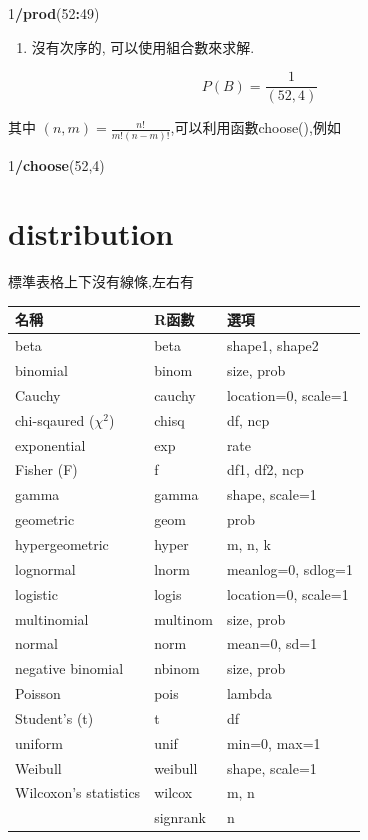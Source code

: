 \documentclass[]{book}
\newenvironment{Shaded}{\begin{snugshade}}{\end{snugshade}}
\newcommand{\KeywordTok}[1]{\textcolor[rgb]{0.13,0.29,0.53}{\textbf{#1}}}
\newcommand{\DecValTok}[1]{\textcolor[rgb]{0.00,0.00,0.81}{#1}}
\newcommand{\OperatorTok}[1]{\textcolor[rgb]{0.81,0.36,0.00}{\textbf{#1}}}
\newcommand{\NormalTok}[1]{#1}
\providecommand{\tightlist}{%
  \setlength{\itemsep}{0pt}\setlength{\parskip}{0pt}}
\theoremstyle{definition}
\theoremstyle{definition}
\theoremstyle{definition}
\theoremstyle{remark}
\begin{document}
\begin{Shaded}
\begin{Highlighting}[]
\DecValTok{1}\OperatorTok{/}\KeywordTok{prod}\NormalTok{(}\DecValTok{52}\OperatorTok{:}\DecValTok{49}\NormalTok{)}
\end{Highlighting}
\end{Shaded}

\begin{enumerate}
\def\labelenumi{\arabic{enumi}.}
\setcounter{enumi}{1}
\tightlist
\item
  沒有次序的, 可以使用組合數來求解.
\end{enumerate}

\[ P(B)=\frac{1}{(52,4)} \]

其中 \((n,m)=\frac{n!}{m!(n-m)!}\),可以利用函數choose(),例如

\begin{Shaded}
\begin{Highlighting}[]
\DecValTok{1}\OperatorTok{/}\KeywordTok{choose}\NormalTok{(}\DecValTok{52}\NormalTok{,}\DecValTok{4}\NormalTok{)}
\end{Highlighting}
\end{Shaded}

\section{distribution}\label{distribution}

標準表格上下沒有線條,左右有

\begin{longtable}[]{@{}lll@{}}
\toprule
名稱 & R函數 & 選項\tabularnewline
\midrule
\endhead
beta & beta & shape1, shape2\tabularnewline
binomial & binom & size, prob\tabularnewline
Cauchy & cauchy & location=0, scale=1\tabularnewline
chi-sqaured (\(\chi^2\)) & chisq & df, ncp\tabularnewline
exponential & exp & rate\tabularnewline
Fisher (F) & f & df1, df2, ncp\tabularnewline
gamma & gamma & shape, scale=1\tabularnewline
geometric & geom & prob\tabularnewline
hypergeometric & hyper & m, n, k\tabularnewline
lognormal & lnorm & meanlog=0, sdlog=1\tabularnewline
logistic & logis & location=0, scale=1\tabularnewline
multinomial & multinom & size, prob\tabularnewline
normal & norm & mean=0, sd=1\tabularnewline
negative binomial & nbinom & size, prob\tabularnewline
Poisson & pois & lambda\tabularnewline
Student's (t) & t & df\tabularnewline
uniform & unif & min=0, max=1\tabularnewline
Weibull & weibull & shape, scale=1\tabularnewline
Wilcoxon's statistics & wilcox & m, n\tabularnewline
& signrank & n\tabularnewline
\bottomrule
\end{longtable}
\end{document}
